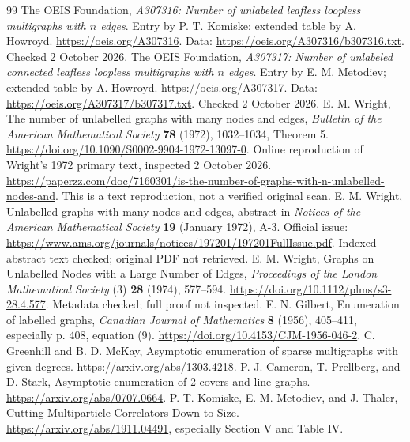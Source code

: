 \documentclass[11pt,letterpaper]{article}
\theoremstyle{remark}\newtheorem{remark}[theorem]{Remark}
\begin{document}
\begin{thebibliography}{99}
 The OEIS Foundation, \emph{A307316: Number of unlabeled leafless loopless multigraphs with $n$ edges}. Entry by P. T. Komiske; extended table by A. Howroyd. \url{https://oeis.org/A307316}. Data: \url{https://oeis.org/A307316/b307316.txt}. Checked 2 October 2026.
 The OEIS Foundation, \emph{A307317: Number of unlabeled connected leafless loopless multigraphs with $n$ edges}. Entry by E. M. Metodiev; extended table by A. Howroyd. \url{https://oeis.org/A307317}. Data: \url{https://oeis.org/A307317/b307317.txt}. Checked 2 October 2026.
 E. M. Wright, The number of unlabelled graphs with many nodes and edges, \emph{Bulletin of the American Mathematical Society} \textbf{78} (1972), 1032--1034, Theorem 5. \url{https://doi.org/10.1090/S0002-9904-1972-13097-0}.
 Online reproduction of Wright's 1972 primary text, inspected 2 October 2026. \url{https://paperzz.com/doc/7160301/is-the-number-of-graphs-with-n-unlabelled-nodes-and}. This is a text reproduction, not a verified original scan.
 E. M. Wright, Unlabelled graphs with many nodes and edges, abstract in \emph{Notices of the American Mathematical Society} \textbf{19} (January 1972), A-3. Official issue: \url{https://www.ams.org/journals/notices/197201/197201FullIssue.pdf}. Indexed abstract text checked; original PDF not retrieved.
 E. M. Wright, Graphs on Unlabelled Nodes with a Large Number of Edges, \emph{Proceedings of the London Mathematical Society} (3) \textbf{28} (1974), 577--594. \url{https://doi.org/10.1112/plms/s3-28.4.577}. Metadata checked; full proof not inspected.
 E. N. Gilbert, Enumeration of labelled graphs, \emph{Canadian Journal of Mathematics} \textbf{8} (1956), 405--411, especially p. 408, equation (9). \url{https://doi.org/10.4153/CJM-1956-046-2}.
 C. Greenhill and B. D. McKay, Asymptotic enumeration of sparse multigraphs with given degrees. \url{https://arxiv.org/abs/1303.4218}.
 P. J. Cameron, T. Prellberg, and D. Stark, Asymptotic enumeration of 2-covers and line graphs. \url{https://arxiv.org/abs/0707.0664}.
 P. T. Komiske, E. M. Metodiev, and J. Thaler, Cutting Multiparticle Correlators Down to Size. \url{https://arxiv.org/abs/1911.04491}, especially Section V and Table IV.
\end{thebibliography}
\end{document}

